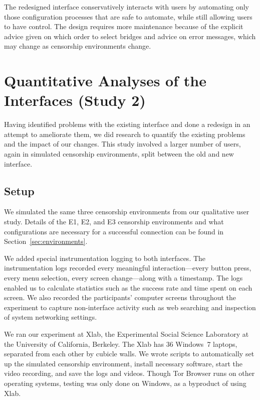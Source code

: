 \documentclass[USenglish,oneside,twocolumn]{article}
\begin{document}
The redesigned interface conservatively interacts with users by automating only those configuration processes that are safe to automate, while still allowing users to have control. The design requires more maintenance because of the explicit advice given on which order to select bridges and advice on error messages, which may change as censorship environments change. 

\section{Quantitative Analyses of the Interfaces (Study 2)}
\label{sec:quantitative}
Having identified problems with the existing interface
and done a redesign in an attempt to ameliorate them,
we did research to quantify the existing problems
and the impact of our changes.
This study involved a larger number of users,
again in simulated censorship environments,
split between the old and new interface.

\subsection{Setup}
We simulated the same three censorship environments from 
our qualitative user study. Details of the E1, E2, and E3
censorship environments and what configurations are necessary for a 
successful connection can be found in Section~\ref{sec:environments}.

We added special instrumentation logging to both interfaces.
The instrumentation logs recorded every meaningful interaction---every
button press, every menu selection, every screen change---along with a timestamp.
The logs enabled us to calculate statistics such as the success rate
and time spent on each screen.
We also recorded the participants' computer screens
throughout the experiment to capture non-interface activity such as 
web searching and inspection of system networking settings.

We ran our experiment at Xlab, the Experimental Social Science Laboratory at the University of 
California, Berkeley.
The Xlab has 36 Windows~7 laptops, separated from each other by cubicle walls. 
We wrote scripts to automatically set up the simulated censorship environment, install necessary software, 
start the video recording, and save the logs and videos.
Though Tor Browser runs on other operating systems,
testing was only done on Windows, as a byproduct of using Xlab. 
\end{document}
